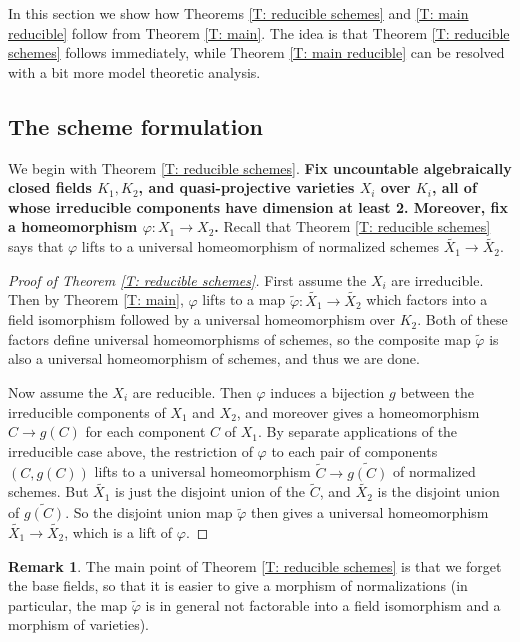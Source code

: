 \documentclass{amsart}
\theoremstyle{definition}
\newtheorem{remark}[theorem]{Remark}
\begin{document}
In this section we show how Theorems \ref{T: reducible schemes} and \ref{T: main reducible} follow from Theorem \ref{T: main}. The idea is that Theorem \ref{T: reducible schemes} follows immediately, while Theorem \ref{T: main reducible} can be resolved with a bit more model theoretic analysis.

\subsection{The scheme formulation}

We begin with Theorem \ref{T: reducible schemes}. \textbf{Fix uncountable algebraically closed fields $K_1,K_2$, and quasi-projective varieties $X_i$ over $K_i$, all of whose irreducible components have dimension at least 2. Moreover, fix a homeomorphism $\varphi:X_1\rightarrow X_2$.} Recall that Theorem \ref{T: reducible schemes} says that $\varphi$ lifts to a universal homeomorphism of normalized schemes $\widetilde{X_1}\rightarrow\widetilde{X_2}$. 

\begin{proof}[Proof of Theorem \ref{T: reducible schemes}] First assume the $X_i$ are irreducible. Then by Theorem \ref{T: main}, $\varphi$ lifts to a map $\widetilde\varphi:\widetilde{X_1}\rightarrow\widetilde{X_2}$ which factors into a field isomorphism followed by a universal homeomorphism over $K_2$. Both of these factors define universal homeomorphisms of schemes, so the composite map $\widetilde\varphi$ is also a universal homeomorphism of schemes, and thus we are done.

Now assume the $X_i$ are reducible. Then $\varphi$ induces a bijection $g$ between the irreducible components of $X_1$ and $X_2$, and moreover gives a homeomorphism $C\rightarrow g(C)$ for each component $C$ of $X_1$. By separate applications of the irreducible case above, the restriction of $\varphi$ to each pair of components $(C,g(C))$ lifts to a universal homeomorphism $\widetilde C\rightarrow\widetilde{g(C)}$ of normalized schemes. But $\widetilde{X_1}$ is just the disjoint union of the $\widetilde C$, and $\widetilde{X_2}$ is the disjoint union of $\widetilde{g(C)}$. So the disjoint union map $\widetilde\varphi$ then gives a universal homeomorphism $\widetilde{X_1}\rightarrow\widetilde{X_2}$, which is a lift of $\varphi$.
\end{proof}

\begin{remark}
    The main point of Theorem \ref{T: reducible schemes} is that we forget the base fields, so that it is easier to give a morphism of normalizations (in particular, the map $\widetilde\varphi$ is in general not factorable into a field isomorphism and a morphism of varieties). 
\end{remark}
\end{document}
